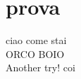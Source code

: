 \documentclass{article}
\begin{document}
    \section{prova}
        ciao come stai\\
        ORCO BOIO\\
        Another try! coi
\end{document}
